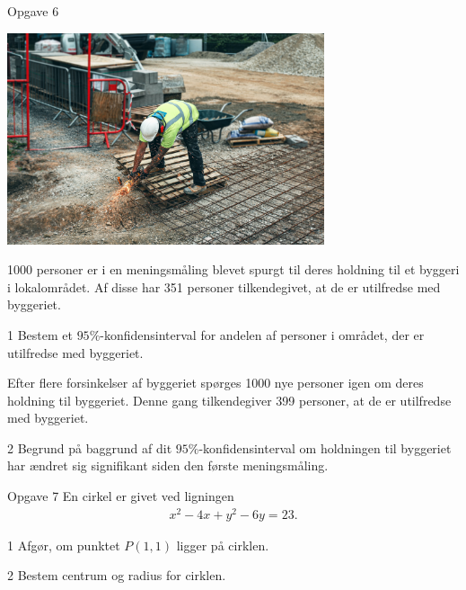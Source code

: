 \documentclass[12pt,x11names,a4paper]{article}
\begin{document}

\begin{opgavetekst}{Opgave 6}
	\begin{center}
		\includegraphics[width = 0.7\textwidth]{Billeder/bygge.jpg}
	\end{center}
	1000 personer er i en meningsmåling blevet spurgt til deres holdning til et byggeri i lokalområdet. Af disse har
	351 personer tilkendegivet, at de er utilfredse med byggeriet. 
\end{opgavetekst}
\begin{delopgave}{}{1}
	Bestem et $95\%$-konfidensinterval for andelen af personer i området, der er utilfredse med byggeriet. 
\end{delopgave}
\begin{meretekst}
	Efter flere forsinkelser af byggeriet spørges 1000 nye personer igen om deres holdning til byggeriet. Denne gang 
	tilkendegiver 399 personer, at de er utilfredse med byggeriet. 
\end{meretekst}
\begin{delopgave}{}{2}
	Begrund på baggrund af dit $95\%$-konfidensinterval om holdningen til byggeriet har ændret sig signifikant siden 
	den første meningsmåling. 
\end{delopgave}


\begin{opgavetekst}{Opgave 7}
	En cirkel er givet ved ligningen 
	\begin{align*}
		x^2-4x+y^2-6y=23.
	\end{align*}
\end{opgavetekst}
\begin{delopgave}{}{1}
	Afgør, om punktet $P(1,1)$ ligger på cirklen. 
\end{delopgave}
\begin{delopgave}{}{2}
	Bestem centrum og radius for cirklen. 
\end{delopgave}
\end{document}
